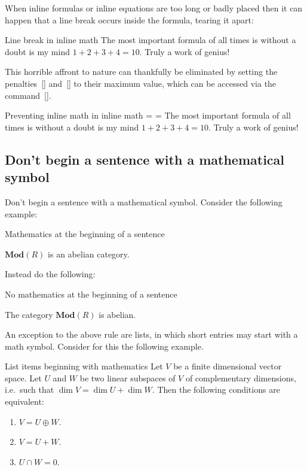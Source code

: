 When inline formulas or inline equations are too long or badly placed then it can happen that a line break occurs inside the formula, tearing it apart:
\begin{showlatex}[before lower = {\binoppenalty=100}, after lower = {\binoppenalty = \maxdimen}]{Line break in inline math}
The most important formula of all times is without a doubt is my mind $1 + 2 + 3 + 4 = 10$.
Truly a work of genius!
\end{showlatex}
This horrible affront to nature can thankfully be eliminated by setting the penalties~[\comname] and~[\comname] to their maximum value, which can be accessed via the command~[\comname].
\begin{showlatex}{Preventing inline math in inline math}
\binoppenalty = \maxdimen
\relpenalty   = \maxdimen
The most important formula of all times is without a doubt is my mind $1 + 2 + 3 + 4 = 10$.
Truly a work of genius!
\end{showlatex}



\subsection{Don’t begin a sentence with a mathematical symbol}

Don’t begin a sentence with a mathematical symbol.
Consider the following example:
\begin{showlatex}{Mathematics at the beginning of a sentence}
\begin{theorem}
  $\mathbf{Mod}(R)$ is an abelian category.
\end{theorem}
\end{showlatex}
Instead do the following:
\begin{showlatex}{No mathematics at the beginning of a sentence}
\begin{theorem}
  The category $\mathbf{Mod}(R)$ is abelian.
\end{theorem}
\end{showlatex}

An exception to the above rule are lists, in which short entries may start with a math symbol.
Consider for this the following example.
\begin{showlatex}{List items beginning with mathematics}
Let $V$ be a finite dimensional vector space.
Let $U$ and $W$ be two linear subspaces of $V$ of complementary dimensions, i.e.\ such that $\dim V = \dim U + \dim W$.
Then the following conditions are equivalent:
\begin{enumerate}[label = \roman*)]
  \item
    $V = U \oplus W$.
  \item
    $V = U + W$.
  \item
    $U \cap W = 0$.
\end{enumerate}
\end{showlatex}



